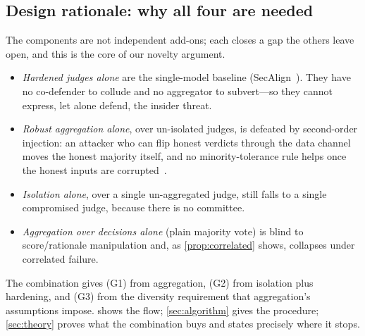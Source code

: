 \subsection{Design rationale: why all four are needed}
\label{sec:rationale}
The components are not independent add-ons; each closes a gap the others leave open, and
this is the core of our novelty argument.
\begin{itemize}[leftmargin=1.4em,itemsep=2pt,topsep=2pt]
  \item \emph{Hardened judges alone} are the single-model baseline
        (SecAlign~\cite{chen2025secalign}). They have no co-defender to collude and no
        aggregator to subvert—so they cannot express, let alone defend, the insider
        threat.
  \item \emph{Robust aggregation alone}, over un-isolated judges, is defeated by
        second-order injection: an attacker who can flip honest verdicts through the data
        channel moves the honest majority itself, and no minority-tolerance rule helps
        once the honest inputs are corrupted~\cite{shi2024judgeinjection}.
  \item \emph{Isolation alone}, over a single un-aggregated judge, still falls to a single
        compromised judge, because there is no committee.
  \item \emph{Aggregation over decisions alone} (plain majority vote) is blind to
        score/rationale manipulation and, as \cref{prop:correlated} shows, collapses under
        correlated failure.
\end{itemize}
The combination gives (G1) from aggregation, (G2) from isolation plus hardening, and (G3)
from the diversity requirement that aggregation's assumptions impose. 
shows the flow; \cref{sec:algorithm} gives the procedure; \cref{sec:theory} proves what
the combination buys and states precisely where it stops.
